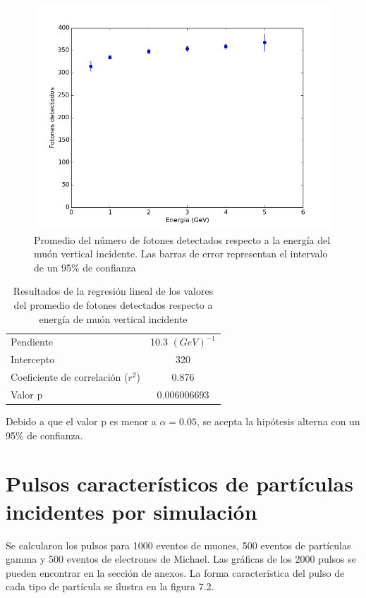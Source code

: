 \documentclass{book}
\begin{document}
\begin{figure}[h] %
\begin{center}
 \includegraphics[width=0.8\linewidth]{DetectadosVsEnergia.png}
\caption{Promedio del n\'umero de fotones detectados respecto a la energ\'ia del mu\'on vertical incidente. Las barras de error representan el intervalo de un 95\% de confianza}
\end{center}
\end{figure}

\begin{table}[h]
\centering
\caption{ Resultados de la regresi\'on lineal de los valores del promedio de fotones detectados respecto a energ\'ia de mu\'on vertical incidente}
\begin{tabular}{l | c}
\hline
Pendiente & 10.3 $(GeV)^{-1}$ \\
Intercepto & 320 \\
Coeficiente de correlaci\'on ($r^2$) & 0.876 \\
Valor p & 0.006006693 \\

\hline
\end{tabular}
\end{table}

Debido a que el valor p es menor a $\alpha=0.05$, se acepta la hip\'otesis alterna con un 95\% de confianza.

\section{Pulsos caracter\'isticos de part\'iculas incidentes por simulaci\'on}

Se calcularon los pulsos para 1000 eventos de muones, 500 eventos de part\'iculas gamma y 500 eventos de electrones de Michael. Las gr\'aficas de los 2000 pulsos se pueden encontrar en la secci\'on de anexos. La forma caracter\'istica del pulso de cada tipo de part\'icula se ilustra en la figura 7.2.
\end{document}
